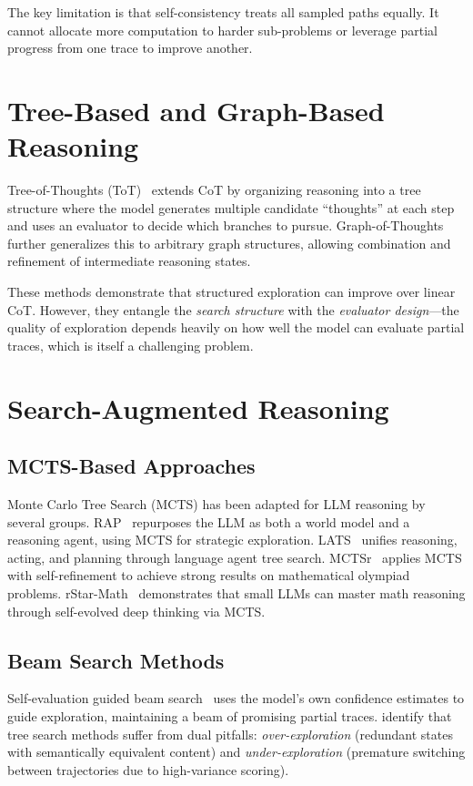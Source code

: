 The key limitation is that self-consistency treats all sampled paths equally. It cannot allocate more computation to harder sub-problems or leverage partial progress from one trace to improve another.

\section{Tree-Based and Graph-Based Reasoning}

Tree-of-Thoughts (ToT)~\citep{yao2024tree} extends CoT by organizing reasoning into a tree structure where the model generates multiple candidate ``thoughts'' at each step and uses an evaluator to decide which branches to pursue. Graph-of-Thoughts~\citep{besta2024graph} further generalizes this to arbitrary graph structures, allowing combination and refinement of intermediate reasoning states.

These methods demonstrate that structured exploration can improve over linear CoT. However, they entangle the \emph{search structure} with the \emph{evaluator design}---the quality of exploration depends heavily on how well the model can evaluate partial traces, which is itself a challenging problem.

\section{Search-Augmented Reasoning}

\subsection{MCTS-Based Approaches}

Monte Carlo Tree Search (MCTS) has been adapted for LLM reasoning by several groups. RAP~\citep{hao2023reasoning} repurposes the LLM as both a world model and a reasoning agent, using MCTS for strategic exploration. LATS~\citep{zhou2024lats} unifies reasoning, acting, and planning through language agent tree search. MCTSr~\citep{zhang2024mctsrmath} applies MCTS with self-refinement to achieve strong results on mathematical olympiad problems. rStar-Math~\citep{guan2025rstar} demonstrates that small LLMs can master math reasoning through self-evolved deep thinking via MCTS.

\subsection{Beam Search Methods}

Self-evaluation guided beam search~\citep{xie2024self} uses the model's own confidence estimates to guide exploration, maintaining a beam of promising partial traces. \cite{wang-etal-2025-dont} identify that tree search methods suffer from dual pitfalls: \emph{over-exploration} (redundant states with semantically equivalent content) and \emph{under-exploration} (premature switching between trajectories due to high-variance scoring).

